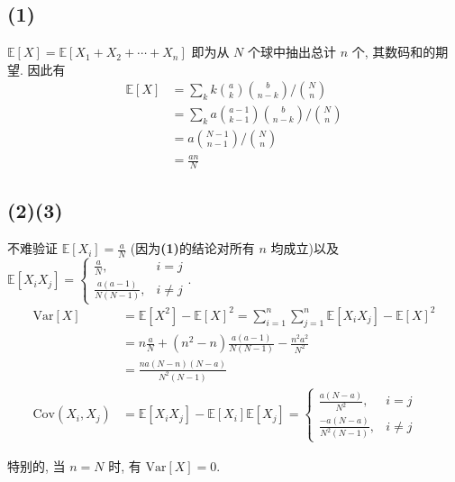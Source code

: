 \documentclass[8pt]{article}
\theoremstyle{compact}
\def\E#1{\mathbb{E}\left[{#1}\right]}
\def\Var#1{\text{Var}\left[{#1}\right]}
\def\Cov#1{\text{Cov}\left({#1}\right)}
\begin{document}
\subsection*{(1)}
$\E{X} = \E{X_1 + X_2 + \cdots + X_n}$ 即为从 $N$ 个球中抽出总计 $n$ 个, 其数码和的期望. 因此有 \begin{equation*}
	\begin{split}
	\E{X} &= \sum_{k} k\binom{a}{k}\binom{b}{n-k} \bigg/ \binom{N}{n} \\&=\sum_{k} a\binom{a-1}{k-1}\binom{b}{n-k} \bigg/ \binom{N}{n} \\&= a\binom{N-1}{n-1}\bigg/\binom{N}{n}\\&= \frac{an}{N}
\end{split}
\end{equation*}
\subsection*{(2)(3)}
不难验证 $\E{X_i} = \frac aN$ (因为\textbf{(1)}的结论对所有 $n$ 均成立)以及 $\E{X_i X_j} = \begin{cases}
	\frac aN, & i = j\\
	\frac{a(a-1)}{N(N-1)}, & i \neq j
\end{cases}$.
\begin{equation*}
	\begin{split}
		\Var{X} &= \E{X^2} - \E{X}^2 = \sum_{i=1}^{n}\sum_{j=1}^{n}\E{X_iX_j} - \E{X}^2\\
		&= n\frac aN + (n^2-n)\frac{a(a-1)}{N(N-1)} - \frac{n^2a^2}{N^2}\\
		&= \frac{na(N-n)(N-a)}{N^2(N-1)}\\
		\Cov{X_i, X_j} &= \E{X_iX_j} - \E{X_i}\E{X_j} = \begin{cases}
			\frac{a(N-a)}{N^2}, & i = j\\
			\frac{-a(N-a)}{N^2(N-1)}, & i \neq j
		\end{cases}
	\end{split}
\end{equation*}

特别的, 当 $n = N$ 时, 有 $\Var{X} = 0$.
\end{document}
